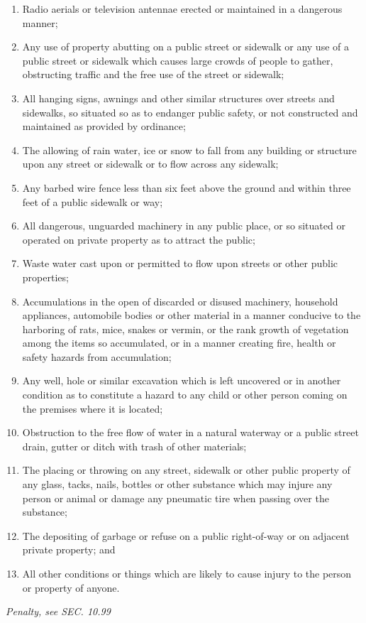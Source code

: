 \documentclass[code.tex]{subfiles}
\begin{document}
\begin{enumerate}[{\indent}A)]
    \item Radio aerials or television antennae erected or maintained in a dangerous manner;
    \item Any use of property abutting on a public street or sidewalk or any use of a public street or sidewalk which causes large crowds of people to gather, obstructing traffic and the free use of the street or sidewalk;
    \item All hanging signs, awnings and other similar structures over streets and sidewalks, so situated so as to endanger public safety, or not constructed and maintained as provided by ordinance;
    \item The allowing of rain water, ice or snow to fall from any building or structure upon any street or sidewalk or to flow across any sidewalk;
    \item Any barbed wire fence less than six feet above the ground and within three feet of a public sidewalk or way;
    \item All dangerous, unguarded machinery in any public place, or so situated or operated on private property as to attract the public;
    \item Waste water cast upon or permitted to flow upon streets or other public properties;
    \item Accumulations in the open of discarded or disused machinery, household appliances, automobile bodies or other material in a manner conducive to the harboring of rats, mice, snakes or vermin, or the rank growth of vegetation among the items so accumulated, or in a manner creating fire, health or safety hazards from accumulation;
    \item Any well, hole or similar excavation which is left uncovered or in another condition as to constitute a hazard to any child or other person coming on the premises where it is located;
    \item Obstruction to the free flow of water in a natural waterway or a public street drain, gutter or ditch with trash of other materials;
    \item The placing or throwing on any street, sidewalk or other public property of any glass, tacks, nails, bottles or other substance which may injure any person or animal or damage any pneumatic tire when passing over the substance;
    \item The depositing of garbage or refuse on a public right-of-way or on adjacent private property; and
    \item All other conditions or things which are likely to cause injury to the person or property of anyone.
\end{enumerate}
\emph{Penalty, see SEC. 10.99}
\end{document}

